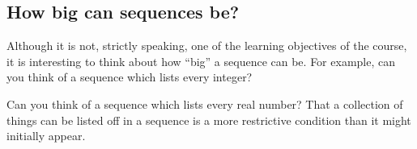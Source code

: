 \documentclass{ximera}
\begin{document}
\subsection{How big can sequences be?}

Although it is not, strictly speaking, one of the learning objectives of the course, it is interesting to think about how ``big'' a sequence can be.  For example, can you think of a sequence which lists every integer?


Can you think of a sequence which lists every real number?  That a collection of things can be listed off in a sequence is a more restrictive condition than it might initially appear.

\end{document}
